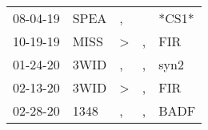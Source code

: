 \begin{supertabular}{p{0.07\textwidth}p{0.06\textwidth}p{0.02\textwidth}p{0.02\textwidth}p{0.06\textwidth}}
 08-04-19\textsuperscript{} &  SPEA\textsuperscript{} &                , &               &                   *CS1* \\
 10-19-19\textsuperscript{} &  MISS\textsuperscript{} &     \textgreater &             , &   FIR\textsuperscript{} \\
 01-24-20\textsuperscript{} &  3WID\textsuperscript{} &                , &             , &  syn2\textsuperscript{} \\
 02-13-20\textsuperscript{} &  3WID\textsuperscript{} &     \textgreater &             , &   FIR\textsuperscript{} \\
 02-28-20\textsuperscript{} &  1348\textsuperscript{} &                , &             , &  BADF\textsuperscript{} \\
\end{supertabular}
